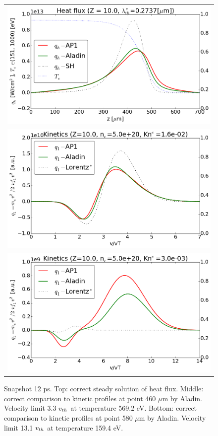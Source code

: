 \begin{figure}[tbh]
  \begin{center}
    \begin{tabular}{c}
      \includegraphics[width=\figscale\textwidth]{../VFPdata/C7_Aladin_case3_heatflux.png} \\
      \includegraphics[width=\figscale\textwidth]{../VFPdata/C7_Aladin_case3_kinetics.png} \\
      \includegraphics[width=\figscale\textwidth]{../VFPdata/C7_Aladin_case3_nonlocal_kinetics.png}  
    \end{tabular}
  \caption{  
  Snapshot 12 ps. Top: correct steady solution of heat flux.  
  Middle: correct comparison to kinetic profiles at point 460 $\mu$m by Aladin. 
  Velocity limit 3.3 $v_{th}$ at temperature 569.2 eV.
  Bottom: correct comparison to kinetic profiles at point 580 $\mu$m by Aladin.
  Velocity limit 13.1 $v_{th}$ at temperature 159.4 eV.
  }
  \label{fig:C7_Aladin_case3}
  \end{center} 
\end{figure}

